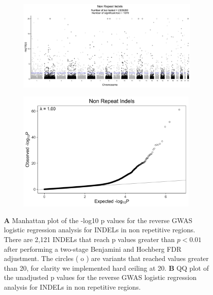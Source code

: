 \documentclass[9pt,lineno]{elife}
\begin{document}
\begin{figure} \centering
    \begin{subfigure}[b]{\linewidth}
        \includegraphics[width=\hsize]{./Figures/ManhattanPlot_NORepeat_Indels.jpg}
        \label{fig:a}
    \end{subfigure} %

    \begin{subfigure}[b]{\linewidth}
    	\center    
        \includegraphics[width=90mm]{./Figures/NORepeat_Indels_QQ.jpg}
        \label{fig:b}    
    \end{subfigure} 
    \caption{\textbf{A} Manhattan plot of the -log10 p values for the reverse GWAS logistic regression analysis for INDELs in non repetitive regions. There are 2,121 INDELs that reach p values greater than $ p < 0.01$ after performing a two-stage Benjamini and Hochberg FDR adjustment.  The circles ( o ) are variants that reached values greater than 20, for clarity we implemented hard ceiling at 20. 
  \textbf{B} QQ plot of the unadjusted p values for the reverse GWAS logistic regression analysis for INDELs in non repetitive regions.}
  \label{NRI_Manhattan}
  \end{figure}
\end{document}
